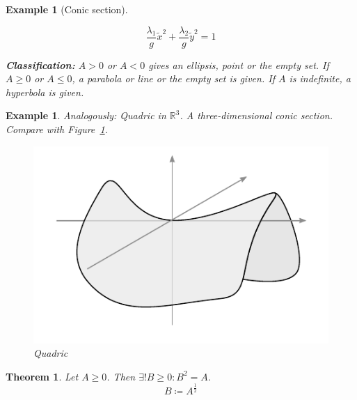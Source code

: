 \documentclass[a4paper]{article}
\newcounter{lecref}[section]
\numberwithin{lecref}{section}
\newtheorem{theorem}[lecref]{Theorem}
\newtheorem{example}[lecref]{Example}
\begin{document}
\begin{example}[Conic section]
\begin{description}
\begin{description}
          \[ \frac{\lambda_1}{g} \tilde x^2 + \frac{\lambda_2}{g} \tilde y^2 = 1 \]

      \end{description}
  \end{description}

  \textbf{Classification:}
  $A > 0$ or $A < 0$ gives an ellipsis, point or the empty set.
  If $A \geq 0$ or $A \leq 0$, a parabola or line or the empty set is given.
  If $A$ is indefinite, a hyperbola is given.
\end{example}

\begin{example} %
  Analogously: Quadric in $\mathbb R^3$.
  A three-dimensional conic section.
  Compare with Figure~\ref{img:quadric}.
  \begin{figure}[t]
    \begin{center}
      \includegraphics{img/16_quadric.pdf}
      \caption{Quadric}
      \label{img:quadric}
    \end{center}
  \end{figure}
\end{example}

\begin{theorem}
   Let $A \geq 0$. Then $\exists! B \geq 0: B^2 = A$.
   \[ B \coloneqq A^{\frac12} \]
\end{theorem}
\end{document}
